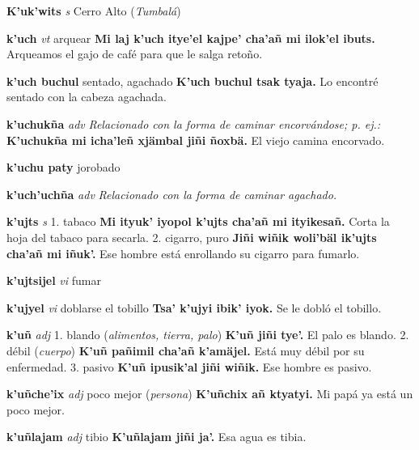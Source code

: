 \documentclass[10pt]{scrbook}
\newcommand{\entry}[1]{\textbf{#1}}
\newcommand{\onedefinition}[1]{#1.}
\newcommand{\nontranslationdef}[1]{\textit{#1}}
\newcommand{\partofspeech}[1]{\textit{#1}}
\newcommand{\spanishtranslation}[1]{#1}
\newcommand{\clarification}[1]{(\textit{#1})}
\newcommand{\cholexample}[1]{\textbf{#1}}
\newcommand{\exampletranslation}[1]{#1}
\begin{document}
\begin{multicols}{2}
\entry{K'uk'wits}
\partofspeech{s}
\spanishtranslation{Cerro Alto}
\clarification{Tumbalá}

\entry{k'uch}
\partofspeech{vt}
\spanishtranslation{arquear}
\cholexample{Mi laj k'uch itye'el kajpe' cha'añ mi ilok'el ibuts.}
\exampletranslation{Arqueamos el gajo de café para que le salga retoño.}

\entry{k'uch buchul}
\spanishtranslation{sentado, agachado}
\cholexample{K'uch buchul tsak tyaja.}
\exampletranslation{Lo encontré sentado con la cabeza agachada.}

\entry{k'uchukña}
\partofspeech{adv}
\nontranslationdef{Relacionado con la forma de caminar encorvándose; p. ej.:}
\cholexample{K'uchukña mi icha'leñ xjämbal jiñi ñoxbä.}
\exampletranslation{El viejo camina encorvado.}

\entry{k'uchu paty}
\spanishtranslation{jorobado}

\entry{k'uch'uchña}
\partofspeech{adv}
\nontranslationdef{Relacionado con la forma de caminar agachado.}

\entry{k'ujts}
\partofspeech{s}
\onedefinition{1}
\spanishtranslation{tabaco}
\cholexample{Mi ityuk' iyopol k'ujts cha'añ mi ityikesañ.}
\exampletranslation{Corta la hoja del tabaco para secarla.}
\onedefinition{2}
\spanishtranslation{cigarro, puro}
\cholexample{Jiñi wiñik woli'bäl ik'ujts cha'añ mi iñuk'.}
\exampletranslation{Ese hombre está enrollando su cigarro para fumarlo.}

\entry{k'ujtsijel}
\partofspeech{vi}
\spanishtranslation{fumar}

\entry{k'ujyel}
\partofspeech{vi}
\spanishtranslation{doblarse el tobillo}
\cholexample{Tsa' k'ujyi ibik' iyok.}
\exampletranslation{Se le dobló el tobillo.}

\entry{k'uñ}
\partofspeech{adj}
\onedefinition{1}
\spanishtranslation{blando}
\clarification{alimentos, tierra, palo}
\cholexample{K'uñ jiñi tye'.}
\exampletranslation{El palo es blando.}
\onedefinition{2}
\spanishtranslation{débil}
\clarification{cuerpo}
\cholexample{K'uñ pañimil cha'añ k'amäjel.}
\exampletranslation{Está muy débil por su enfermedad.}
\onedefinition{3}
\spanishtranslation{pasivo}
\cholexample{K'uñ ipusik'al jiñi wiñik.}
\exampletranslation{Ese hombre es pasivo.}

\entry{k'uñche'ix}
\partofspeech{adj}
\spanishtranslation{poco mejor}
\clarification{persona}
\cholexample{K'uñchix añ ktyatyi.}
\exampletranslation{Mi papá ya está un poco mejor.}

\entry{k'uñlajam}
\partofspeech{adj}
\spanishtranslation{tibio}
\cholexample{K'uñlajam jiñi ja'.}
\exampletranslation{Esa agua es tibia.}


\end{multicols}
\end{document}
